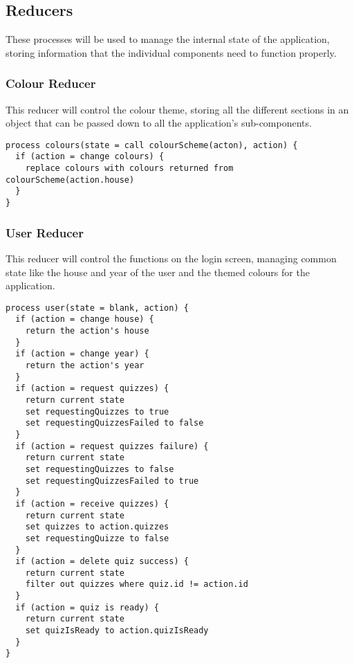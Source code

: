 \subsection{Reducers}
These processes will be used to manage the internal state of the application, storing information that the individual components need to function properly.

\subsubsection{Colour Reducer} %
\label{ssub:colour_reducer}
This reducer will control the colour theme, storing all the different sections in an object that can be passed down to all the application's sub-components.

\begin{verbatim}
process colours(state = call colourScheme(acton), action) {
  if (action = change colours) {
    replace colours with colours returned from colourScheme(action.house)
  }
}
\end{verbatim}

\subsubsection{User Reducer} %
\label{ssub:login_reducer}
This reducer will control the functions on the login screen, managing common state like the house and year of the user and the themed colours for the application.

\begin{verbatim}
process user(state = blank, action) {
  if (action = change house) {
    return the action's house
  }
  if (action = change year) {
    return the action's year
  }
  if (action = request quizzes) {
    return current state
    set requestingQuizzes to true
    set requestingQuizzesFailed to false
  }
  if (action = request quizzes failure) {
    return current state
    set requestingQuizzes to false
    set requestingQuizzesFailed to true
  }
  if (action = receive quizzes) {
    return current state
    set quizzes to action.quizzes
    set requestingQuizze to false
  }
  if (action = delete quiz success) {
    return current state
    filter out quizzes where quiz.id != action.id
  }
  if (action = quiz is ready) {
    return current state
    set quizIsReady to action.quizIsReady
  }
}
\end{verbatim}

